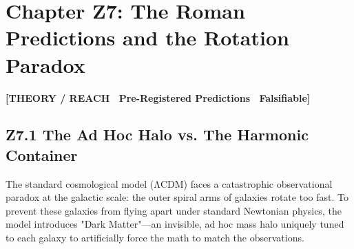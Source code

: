 \documentclass[11pt, letterpaper, openany]{book}
\begin{document}
\vspace{0.5cm}
\begin{center}
\end{center}

\section*{Chapter Z7: The Roman Predictions and the Rotation Paradox}

\begin{center}
{\color{theorytag}\textbf{[THEORY / REACH \textbullet\ Pre-Registered Predictions \textbullet\ Falsifiable]}}
\end{center}

\subsection*{Z7.1 The Ad Hoc Halo vs. The Harmonic Container}

The standard cosmological model (ΛCDM) faces a catastrophic observational paradox at the galactic scale: the outer spiral arms of galaxies rotate too fast. To prevent these galaxies from flying apart under standard Newtonian physics, the model introduces "Dark Matter"—an invisible, ad hoc mass halo uniquely tuned to each galaxy to artificially force the math to match the observations.
\end{document}
